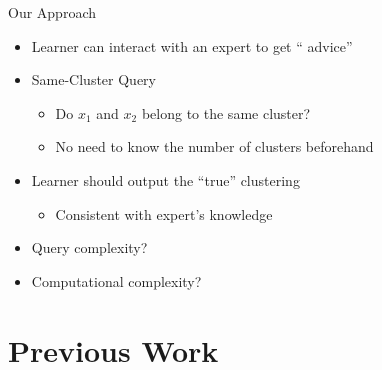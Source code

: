 \documentclass{beamer}
\begin{document}
\begin{frame}{Our Approach}
  \begin{itemize}
  \item {
     Learner can {\color{red}interact} with an expert to get ``{\color{red} advice}''
     
  }
  \pause
  \item {   
    Same-Cluster Query
    \begin{itemize}
        \item Do $x_1$ and $x_2$ belong to the same cluster?
        \item No need to know the number of clusters beforehand
    \end{itemize}
  }
  \pause 
  \item {   
    Learner should output the ``true'' clustering
    \begin{itemize}
        \item Consistent with expert's knowledge
    \end{itemize}
  }
  \pause 
  \item Query complexity?
  \item Computational complexity?
  
  \end{itemize}
\end{frame}

\section{Previous Work}
\end{document}
